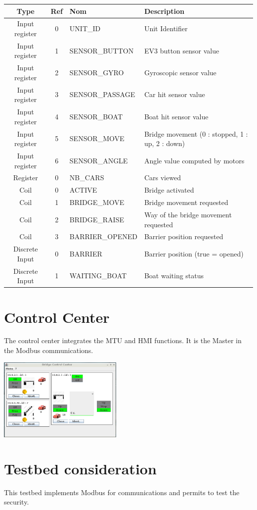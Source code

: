 \documentclass[10pt,a4paper]{article}
\begin{document}
		\begin{tabular}{|c|c|l|l|}
		\hline 
		\textbf{Type} & \textbf{Ref} & \textbf{Nom} & \textbf{Description} \\ 
		\hline 
		Input register & 0 & UNIT\_ID & Unit Identifier\\ 
		\hline 
		Input register & 1 & SENSOR\_BUTTON & EV3 button sensor value\\ 
		\hline 
		Input register & 2 & SENSOR\_GYRO & Gyroscopic sensor value\\ 
		\hline 
		Input register & 3 & SENSOR\_PASSAGE & Car hit sensor value\\ 
		\hline 
		Input register & 4 & SENSOR\_BOAT & Boat hit sensor value\\ 
		\hline 
		Input register & 5 & SENSOR\_MOVE & Bridge movement (0 : stopped, 1 : up, 2 : down) \\ 
		\hline 
		Input register & 6 & SENSOR\_ANGLE & Angle value computed by motors\\ 
		\hline 
		Register & 0 & NB\_CARS & Cars viewed\\ 
		\hline 
		Coil & 0 & ACTIVE & Bridge activated\\ 
		\hline 
		Coil & 1 & BRIDGE\_MOVE & Bridge movement requested\\ 
		\hline 
		Coil & 2 & BRIDGE\_RAISE & Way of the bridge movement requested\\
		\hline 
		Coil & 3 & BARRIER\_OPENED & Barrier position requested\\ 
		\hline 
		Discrete Input & 0 & BARRIER & Barrier position (true = opened) \\ 
		\hline 
		Discrete Input & 1 & WAITING\_BOAT & Boat waiting status\\ 
		\hline 
		\end{tabular} 
		
\section{Control Center}
    The control center integrates the MTU and HMI functions. It is the Master in the Modbus communications.
    
	\begin{center}
	\includegraphics[height=4cm]{rsrc/CC_screenshot.png}
	\end{center}


\section{Testbed consideration}

    This testbed implements Modbus for communications and permits to test the security.
    
\end{document}
